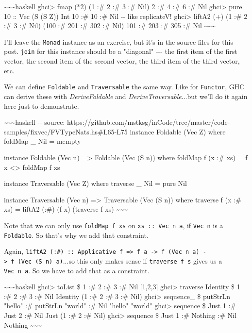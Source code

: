 \documentclass[]{article}
\begin{document}
\textasciitilde{}\textasciitilde{}\textasciitilde{}haskell ghci\textgreater{}
fmap (*2) (1 :\# 2 :\# 3 :\# Nil) 2 :\# 4 :\# 6 :\# Nil ghci\textgreater{} pure
10 :: Vec (S (S Z)) Int 10 :\# 10 :\# Nil -\/- like replicateV!
ghci\textgreater{} liftA2 (+) (1 :\# 2 :\# 3 :\# Nil) (100 :\# 201 :\# 302 :\#
Nil) 101 :\# 203 :\# 305 :\# Nil
\textasciitilde{}\textasciitilde{}\textasciitilde{}

I'll leave the \texttt{Monad} instance as an exercise, but it's in the source
files for this post. \texttt{join} for this instance should be a "diagonal"
-\/-\/- the first item of the first vector, the second item of the second
vector, the third item of the third vector, etc.

We can define \texttt{Foldable} and \texttt{Traversable} the same way. Like for
\texttt{Functor}, GHC can derive these with \emph{DeriveFoldable} and
\emph{DeriveTraversable}...but we'll do it again here just to demonstrate.

\textasciitilde{}\textasciitilde{}\textasciitilde{}haskell -\/- source:
https://github.com/mstksg/inCode/tree/master/code-samples/fixvec/FVTypeNats.hs\#L65-L75
instance Foldable (Vec Z) where foldMap \_ Nil = mempty

instance Foldable (Vec n) =\textgreater{} Foldable (Vec (S n)) where foldMap f
(x :\# xs) = f x \textless{}\textgreater{} foldMap f xs

instance Traversable (Vec Z) where traverse \_ Nil = pure Nil

instance Traversable (Vec n) =\textgreater{} Traversable (Vec (S n)) where
traverse f (x :\# xs) = liftA2 (:\#) (f x) (traverse f xs)
\textasciitilde{}\textasciitilde{}\textasciitilde{}

Note that we can only use \texttt{foldMap\ f\ xs} on \texttt{xs\ ::\ Vec\ n\ a},
if \texttt{Vec\ n} is a \texttt{Foldable}. So that's why we add that constraint.

Again,
\texttt{liftA2\ (:\#)\ ::\ Applicative\ f\ =\textgreater{}\ f\ a\ -\textgreater{}\ f\ (Vec\ n\ a)\ -\textgreater{}\ f\ (Vec\ (S\ n)\ a)}...so
this only makes sense if \texttt{traverse\ f\ s} gives us a \texttt{Vec\ n\ a}.
So we have to add that as a constraint.

\textasciitilde{}\textasciitilde{}\textasciitilde{}haskell ghci\textgreater{}
toList \$ 1 :\# 2 :\# 3 :\# Nil {[}1,2,3{]} ghci\textgreater{} traverse Identity
\$ 1 :\# 2 :\# 3 :\# Nil Identity (1 :\# 2 :\# 3 :\# Nil) ghci\textgreater{}
sequence\_ \$ putStrLn "hello" :\# putStrLn "world" :\# Nil "hello" "world"
ghci\textgreater{} sequence \$ Just 1 :\# Just 2 :\# Nil Just (1 :\# 2 :\# Nil)
ghci\textgreater{} sequence \$ Just 1 :\# Nothing :\# Nil Nothing
\textasciitilde{}\textasciitilde{}\textasciitilde{}
\end{document}
